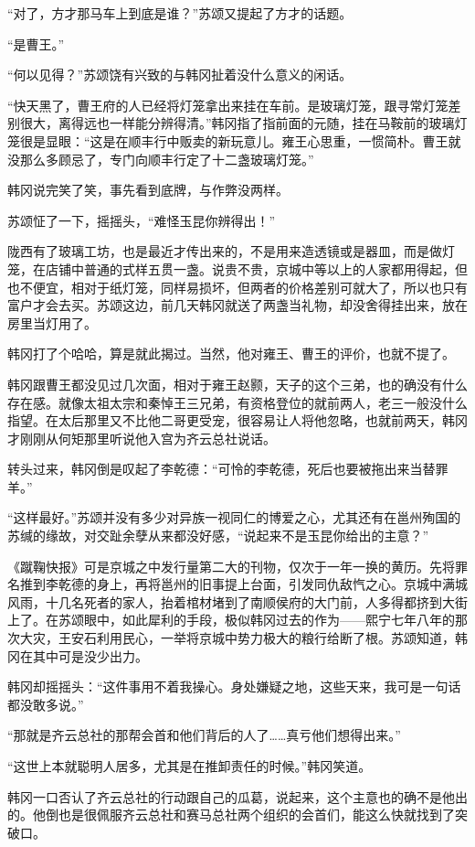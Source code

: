 “对了，方才那马车上到底是谁？”苏颂又提起了方才的话题。

“是曹王。”

“何以见得？”苏颂饶有兴致的与韩冈扯着没什么意义的闲话。

“快天黑了，曹王府的人已经将灯笼拿出来挂在车前。是玻璃灯笼，跟寻常灯笼差别很大，离得远也一样能分辨得清。”韩冈指了指前面的元随，挂在马鞍前的玻璃灯笼很是显眼：“这是在顺丰行中贩卖的新玩意儿。雍王心思重，一惯简朴。曹王就没那么多顾忌了，专门向顺丰行定了十二盏玻璃灯笼。”

韩冈说完笑了笑，事先看到底牌，与作弊没两样。

苏颂怔了一下，摇摇头，“难怪玉昆你辨得出！”

陇西有了玻璃工坊，也是最近才传出来的，不是用来造透镜或是器皿，而是做灯笼，在店铺中普通的式样五贯一盏。说贵不贵，京城中等以上的人家都用得起，但也不便宜，相对于纸灯笼，同样易损坏，但两者的价格差别可就大了，所以也只有富户才会去买。苏颂这边，前几天韩冈就送了两盏当礼物，却没舍得挂出来，放在房里当灯用了。

韩冈打了个哈哈，算是就此揭过。当然，他对雍王、曹王的评价，也就不提了。

韩冈跟曹王都没见过几次面，相对于雍王赵颢，天子的这个三弟，也的确没有什么存在感。就像太祖太宗和秦悼王三兄弟，有资格登位的就前两人，老三一般没什么指望。在太后那里又不比他二哥更受宠，很容易让人将他忽略，也就前两天，韩冈才刚刚从何矩那里听说他入宫为齐云总社说话。

转头过来，韩冈倒是叹起了李乾德：“可怜的李乾德，死后也要被拖出来当替罪羊。”

“这样最好。”苏颂并没有多少对异族一视同仁的博爱之心，尤其还有在邕州殉国的苏缄的缘故，对交趾余孽从来都没好感，“说起来不是玉昆你给出的主意？”

《蹴鞠快报》可是京城之中发行量第二大的刊物，仅次于一年一换的黄历。先将罪名推到李乾德的身上，再将邕州的旧事提上台面，引发同仇敌忾之心。京城中满城风雨，十几名死者的家人，抬着棺材堵到了南顺侯府的大门前，人多得都挤到大街上了。在苏颂眼中，如此犀利的手段，极似韩冈过去的作为——熙宁七年八年的那次大灾，王安石利用民心，一举将京城中势力极大的粮行给断了根。苏颂知道，韩冈在其中可是没少出力。

韩冈却摇摇头：“这件事用不着我操心。身处嫌疑之地，这些天来，我可是一句话都没敢多说。”

“那就是齐云总社的那帮会首和他们背后的人了……真亏他们想得出来。”

“这世上本就聪明人居多，尤其是在推卸责任的时候。”韩冈笑道。

韩冈一口否认了齐云总社的行动跟自己的瓜葛，说起来，这个主意也的确不是他出的。他倒也是很佩服齐云总社和赛马总社两个组织的会首们，能这么快就找到了突破口。

